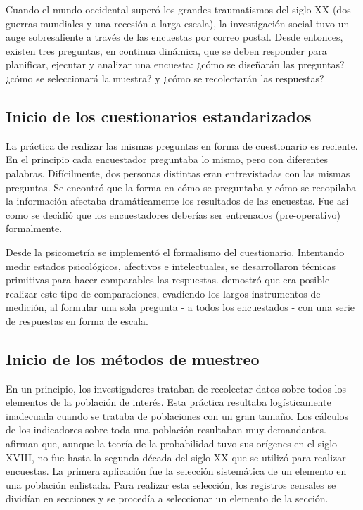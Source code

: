 \documentclass[
  12pt,
  spanish,
]{book}
\begin{document}
Cuando el mundo occidental superó los grandes traumatismos del siglo XX (dos guerras mundiales y una recesión a larga escala), la investigación social tuvo un auge sobresaliente a través de las encuestas por correo postal. Desde entonces, existen tres preguntas, en continua dinámica, que se deben responder para planificar, ejecutar y analizar una encuesta: ¿cómo se diseñarán las preguntas? ¿cómo se seleccionará la muestra? y ¿cómo se recolectarán las respuestas?

\hypertarget{inicio-de-los-cuestionarios-estandarizados}{%
\subsection*{Inicio de los cuestionarios estandarizados}\label{inicio-de-los-cuestionarios-estandarizados}}

La práctica de realizar las mismas preguntas en forma de cuestionario es reciente. En el principio cada encuestador preguntaba lo mismo, pero con diferentes palabras. Difícilmente, dos personas distintas eran entrevistadas con las mismas preguntas. Se encontró que la forma en cómo se preguntaba y cómo se recopilaba la información afectaba dramáticamente los resultados de las encuestas. Fue así como se decidió que los encuestadores deberías ser entrenados (pre-operativo) formalmente.

Desde la psicometría se implementó el formalismo del cuestionario. Intentando medir estados psicológicos, afectivos e intelectuales, se desarrollaron técnicas primitivas para hacer comparables las respuestas. \citet{Likert_1932} demostró que era posible realizar este tipo de comparaciones, evadiendo los largos instrumentos de medición, al formular una sola pregunta - a todos los encuestados - con una serie de respuestas en forma de escala.

\hypertarget{inicio-de-los-muxe9todos-de-muestreo}{%
\subsection*{Inicio de los métodos de muestreo}\label{inicio-de-los-muxe9todos-de-muestreo}}

En un principio, los investigadores trataban de recolectar datos sobre todos los elementos de la población de interés. Esta práctica resultaba logísticamente inadecuada cuando se trataba de poblaciones con un gran tamaño. Los cálculos de los indicadores sobre toda una población resultaban muy demandantes. \citet{Groves_Fowler_Couper_Lepkowski_Singer_Tourangeau_2009} afirman que, aunque la teoría de la probabilidad tuvo sus orígenes en el siglo XVIII, no fue hasta la segunda década del siglo XX que se utilizó para realizar encuestas. La primera aplicación fue la selección sistemática de un elemento en una población enlistada. Para realizar esta selección, los registros censales se dividían en secciones y se procedía a seleccionar un elemento de la sección.
\end{document}
